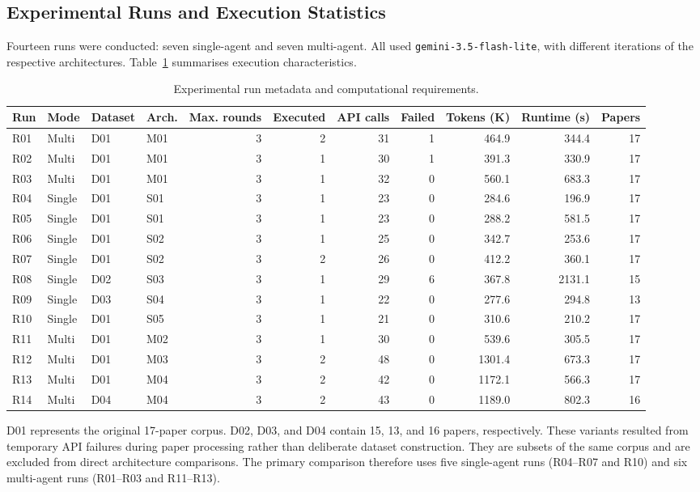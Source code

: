 \documentclass[sigconf,review,anonymous=false]{acmart}
\begin{document}
\subsection{Experimental Runs and Execution Statistics}
Fourteen runs were conducted: seven single-agent and seven multi-agent. All used \texttt{gemini-3.5-flash-lite}, with different iterations of the respective architectures. Table~\ref{tab:runs} summarises execution characteristics.
\begin{table}[t]
\caption{Experimental run metadata and computational requirements.}
\label{tab:runs}
\centering\scriptsize
\begin{tabular}{ll l l r r r r r r r}
\toprule
Run & Mode & Dataset & Arch. & Max. rounds & Executed & API calls & Failed & Tokens (K) & Runtime (s) & Papers \\
\midrule
R01 & Multi & D01 & M01 & 3 & 2 & 31 & 1 & 464.9 & 344.4 & 17 \\
R02 & Multi & D01 & M01 & 3 & 1 & 30 & 1 & 391.3 & 330.9 & 17 \\
R03 & Multi & D01 & M01 & 3 & 1 & 32 & 0 & 560.1 & 683.3 & 17 \\
R04 & Single & D01 & S01 & 3 & 1 & 23 & 0 & 284.6 & 196.9 & 17 \\
R05 & Single & D01 & S01 & 3 & 1 & 23 & 0 & 288.2 & 581.5 & 17 \\
R06 & Single & D01 & S02 & 3 & 1 & 25 & 0 & 342.7 & 253.6 & 17 \\
R07 & Single & D01 & S02 & 3 & 2 & 26 & 0 & 412.2 & 360.1 & 17 \\
R08 & Single & D02 & S03 & 3 & 1 & 29 & 6 & 367.8 & 2131.1 & 15 \\
R09 & Single & D03 & S04 & 3 & 1 & 22 & 0 & 277.6 & 294.8 & 13 \\
R10 & Single & D01 & S05 & 3 & 1 & 21 & 0 & 310.6 & 210.2 & 17 \\
R11 & Multi & D01 & M02 & 3 & 1 & 30 & 0 & 539.6 & 305.5 & 17 \\
R12 & Multi & D01 & M03 & 3 & 2 & 48 & 0 & 1301.4 & 673.3 & 17 \\
R13 & Multi & D01 & M04 & 3 & 2 & 42 & 0 & 1172.1 & 566.3 & 17 \\
R14 & Multi & D04 & M04 & 3 & 2 & 43 & 0 & 1189.0 & 802.3 & 16 \\
\bottomrule
\end{tabular}
\end{table}

D01 represents the original 17-paper corpus. D02, D03, and D04 contain 15, 13, and 16 papers, respectively. These variants resulted from temporary API failures during paper processing rather than deliberate dataset construction. They are subsets of the same corpus and are excluded from direct architecture comparisons. The primary comparison therefore uses five single-agent runs (R04--R07 and R10) and six multi-agent runs (R01--R03 and R11--R13).
\end{document}
